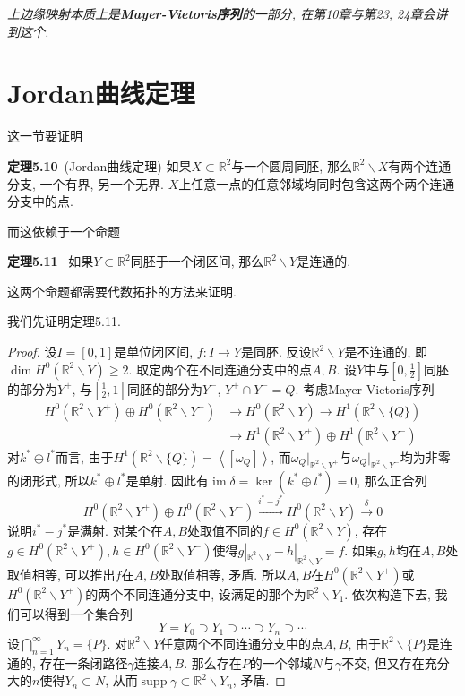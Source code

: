 \documentclass[11pt]{article}
\theoremstyle{definition}\newtheorem*{analyse}{分析}
\theoremstyle{remark}\newtheorem{rem*}{评注}
\newenvironment{env}[1]{\par\vspace{1em}\noindent\textbf{#1}\ }{\par\vspace{1em}}
\DeclareMathOperator{\supp}{supp}
\DeclareMathOperator{\im}{im}
\begin{document}
{\it 上边缘映射本质上是\textbf{Mayer-Vietoris序列}的一部分, 在第10章与第23, 24章会讲到这个.}

\section{Jordan曲线定理}
这一节要证明
\begin{env}{定理5.10}(Jordan曲线定理)
    如果$X\subset\mathbb{R}^2$与一个圆周同胚, 那么$\mathbb{R}^2\backslash X$有两个连通分支, 一个有界, 另一个无界.
    $X$上任意一点的任意邻域均同时包含这两个两个连通分支中的点.
\end{env}
\noindent 而这依赖于一个命题
\begin{env}{定理5.11}
    如果$Y\subset\mathbb{R}^2$同胚于一个闭区间, 那么$\mathbb{R}^2\backslash Y$是连通的.
\end{env}
\noindent 这两个命题都需要代数拓扑的方法来证明.

我们先证明定理5.11.
\begin{proof}
    设$I=[0,1]$是单位闭区间, $f:I\to Y$是同胚.
    反设$\mathbb{R}^2\backslash Y$是不连通的, 即$\dim H^0(\mathbb{R}^2\backslash Y)\geq 2$.
    取定两个在不同连通分支中的点$A,B$.
    设$Y$中与$\left[0,\frac{1}{2}\right]$同胚的部分为$Y^+$, 与$\left[\frac{1}{2},1\right]$同胚的部分为$Y^-$, $Y^+\cap Y^-=Q$.
    考虑Mayer-Vietoris序列
    \begin{align*}
    H^0(\mathbb{R}^2\backslash Y^+)\oplus H^0(\mathbb{R}^2\backslash Y^-)&\longrightarrow H^0(\mathbb{R}^2\backslash Y)
    \longrightarrow H^1(\mathbb{R}^2\backslash\{Q\})\\
    &\longrightarrow H^1(\mathbb{R}^2\backslash Y^+)\oplus H^1(\mathbb{R}^2\backslash Y^-)
    \end{align*}
    对$k^*\oplus l^*$而言, 由于$H^1(\mathbb{R}^2\backslash\{Q\})=\left\langle[\omega_{Q}]\right\rangle$, 而$\omega_{Q}|_{\mathbb{R}^2\backslash Y^+}$与$\omega_{Q}|_{\mathbb{R}^2\backslash Y^-}$均为非零的闭形式, 所以$k^*\oplus l^*$是单射.
    因此有$\im\delta=\ker(k^*\oplus l^*)=0$, 那么正合列
    \[H^0(\mathbb{R}^2\backslash Y^+)\oplus H^0(\mathbb{R}^2\backslash Y^-)\xrightarrow{i^*-j^*} H^0(\mathbb{R}^2\backslash Y)\xrightarrow{\delta}0\]
    说明$i^*-j^*$是满射. 对某个在$A,B$处取值不同的$f\in H^0(\mathbb{R}^2\backslash Y)$, 存在$g\in H^0(\mathbb{R}^2\backslash Y^+),h\in H^0(\mathbb{R}^2\backslash Y^-)$使得$g|_{\mathbb{R}^2\backslash Y}-h|_{\mathbb{R}^2\backslash Y}=f$.
    如果$g,h$均在$A,B$处取值相等, 可以推出$f$在$A,B$处取值相等, 矛盾.
    所以$A,B$在$H^0(\mathbb{R}^2\backslash Y^+)$或$H^0(\mathbb{R}^2\backslash Y^+)$的两个不同连通分支中, 设满足的那个为$\mathbb{R}^2\backslash Y_1$.
    依次构造下去, 我们可以得到一个集合列
    \[Y=Y_0\supset Y_1\supset\cdots\supset Y_n\supset\cdots\]
    设$\bigcap_{n=1}^\infty Y_n=\{P\}$.
    对$\mathbb{R}^2\backslash Y$任意两个不同连通分支中的点$A,B$, 由于$\mathbb{R}^2\backslash\{P\}$是连通的, 存在一条闭路径$\gamma$连接$A,B$.
    那么存在$P$的一个邻域$N$与$\gamma$不交, 但又存在充分大的$n$使得$Y_n\subset N$, 从而$\supp\gamma\subset\mathbb{R}^2\backslash Y_n$, 矛盾.
\end{proof}
\end{document}
